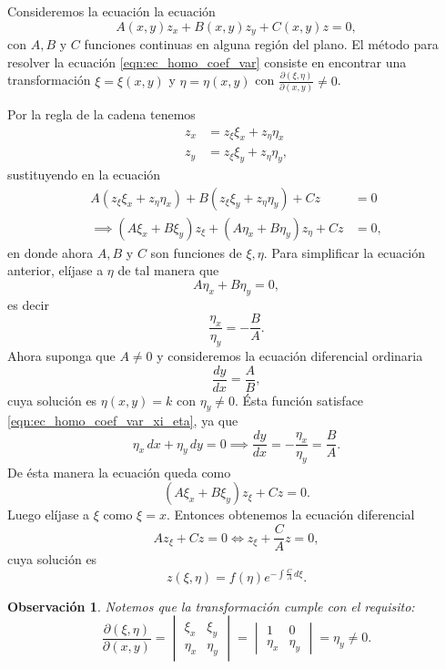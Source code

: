 \documentclass[11pt,letterpaper,draft]{report}
\newtheorem{obs}[defn]{Observación}
\newcommand\<{\langle}
\renewcommand\>{\rangle}
\begin{document}
Consideremos la ecuación la ecuación
\begin{equation}
  \label{eqn:ec_homo_coef_var}
  A(x,y) z_x + B(x,y) z_y + C(x,y) z = 0,
\end{equation} 
con $A,B$ y $C$ funciones continuas en alguna región del
plano. El método para resolver la ecuación
\ref{eqn:ec_homo_coef_var} consiste en encontrar una
transformación $\xi = \xi(x,y)$ y  $\eta = \eta(x,y)$ con
$\frac{\partial(\xi,\eta)}{\partial(x,y)} \neq 0$.

Por la regla de la cadena tenemos
\begin{align*}
  z_x &= z_\xi \xi_x + z_\eta \eta_x\\
  z_y &= z_\xi \xi_y + z_\eta \eta_y,
\end{align*}
sustituyendo en la ecuación
\begin{align*}
  A(z_\xi \xi_x + z_\eta \eta_x) + B(z_\xi \xi_y + z_\eta
  \eta_y) + Cz &= 0\\
  \implies (A\xi_x + B \xi_y)z_\xi + (A\eta_x +
  B\eta_y)z_\eta + Cz &= 0,
\end{align*}
en donde ahora $A,B$ y $C$ son funciones de $\xi, \eta$.
Para simplificar la ecuación anterior, elíjase a $\eta$ de
tal manera que
\[
A\eta_x + B\eta_y = 0,
\] 
es decir
\begin{equation}
  \label{eqn:ec_homo_coef_var_xi_eta}
  \frac{\eta_x}{\eta_y} = -\frac{B}{A}.
\end{equation} 
Ahora suponga que $A \neq 0$ y consideremos la ecuación
diferencial ordinaria
\[
\frac{dy}{dx} = \frac{A}{B},
\] 
cuya solución es $\eta(x,y) = k$ con $\eta_y \neq 0$. Ésta
función satisface \ref{eqn:ec_homo_coef_var_xi_eta}, ya que
\[
\eta_x \, dx + \eta_y \, dy = 0 \implies \frac{dy}{dx} =
-\frac{\eta_x}{\eta_y} = \frac{B}{A}.
\] 
De ésta manera la ecuación queda como
\[
  (A \xi_x + B \xi_y)z_\xi + C z = 0.
\] 
Luego elíjase a $\xi$ como $\xi = x$. Entonces obtenemos la
ecuación diferencial
\[
A z_\xi + C z = 0 \iff z_\xi + \frac{C}{A} z = 0,
\]
cuya solución es
\[
z(\xi,\eta) = f(\eta) e^{-\int \frac{C}{A} \, d\xi}
.\] 
\begin{obs}
  Notemos que la transformación cumple con el requisito:
  \[
  \frac{\partial(\xi,\eta)}{\partial(x,y)} = 
  \begin{vmatrix}
    \xi_x & \xi_y\\
    \eta_x & \eta_y
  \end{vmatrix} = 
  \begin{vmatrix}
    1 & 0\\
    \eta_x & \eta_y
  \end{vmatrix} = \eta_y \neq 0
  .\] 
\end{obs}
\end{document}
